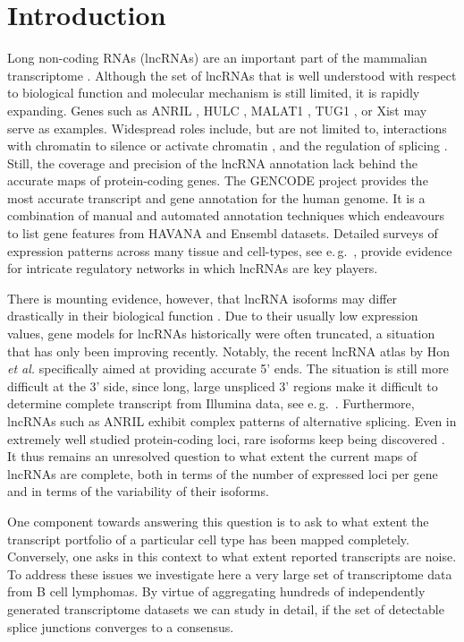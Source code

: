 \documentclass[ncrna,article,submit,moreauthors,pdftex,10pt,a4paper]{mdpi}
\begin{document}
\section{Introduction}

Long non-coding RNAs (lncRNAs) are an important part of the mammalian
transcriptome \cite{Clark:11a,ENCODE:12}. Although the set of lncRNAs that
is well understood with respect to biological function and molecular
mechanism is still limited, it is rapidly expanding. Genes such as ANRIL
\cite{Li:16A,Aguilo:16}, HULC \cite{Yu:17}, MALAT1 \cite{Liu:17}, TUG1
\cite{Li:16}, or Xist \cite{daRocha:17} may serve as examples. Widespread
roles include, but are not limited to, interactions with chromatin to
silence or activate chromatin \cite{guttmannat2012,Deng:16}, and the
regulation of splicing \cite{Luco:16}. Still, the coverage and precision of
the lncRNA annotation lack behind the accurate maps of protein-coding
genes.  The GENCODE project \cite{harrow2012} provides the most accurate
transcript and gene annotation for the human genome. It is a combination of
manual and automated annotation techniques which endeavours to list gene
features from HAVANA and Ensembl datasets. Detailed surveys of expression
patterns across many tissue and cell-types, see e.\,g.\
\cite{cabili2011,MasPonte:17,Hon:17}, provide evidence for intricate
regulatory networks in which lncRNAs are key players.

There is mounting evidence, however, that lncRNA isoforms may differ
drastically in their biological function \cite{Holdt:13a,Bozgeyik:16}. Due
to their usually low expression values, gene models for lncRNAs
historically were often truncated, a situation that has only been improving
recently.  Notably, the recent lncRNA atlas by Hon \emph{et al.}
\cite{Hon:17} specifically aimed at providing accurate 5' ends. The
situation is still more difficult at the 3' side, since long, large
unspliced 3' regions make it difficult to determine complete transcript from
Illumina data, see e.\,g.\ \cite{Mercer:10,Engelhardt:15a}. Furthermore,
lncRNAs such as ANRIL \cite{Holdt:13a} exhibit complex patterns of
alternative splicing. Even in extremely well studied protein-coding loci,
rare isoforms keep being discovered \cite{Hoffmann:14a}. It thus remains an
unresolved question to what extent the current maps of lncRNAs are complete,
both in terms of the number of expressed loci per gene and in terms of the
variability of their isoforms.

One component towards answering this question is to ask to what extent the
transcript portfolio of a particular cell type has been mapped completely.
Conversely, one asks in this context to what extent reported transcripts
are noise. To address these issues we investigate here a very large set of
transcriptome data from B cell lymphomas. By virtue of aggregating hundreds
of independently generated transcriptome datasets we can study in detail, if the set of detectable splice junctions converges to a consensus.
\end{document}

